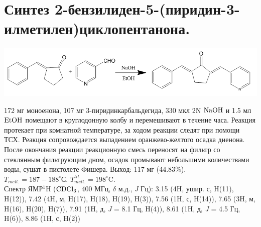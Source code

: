 \documentclass[a4paper]{article}
\begin{document}
\section{Синтез 2-бензилиден-5-(пиридин-3-илметилен)циклопентанона.}
\begin{center}
\includegraphics[scale=0.35]{pictures/3.png}
\end{center}
172 мг моноенона, 107 мг 3-пиридинкарбальдегида, 330 мкл 2N $\ce{NaOH}$ и 1.5 мл $\ce{EtOH}$ помещают в круглодонную колбу и перемешивают в течение часа. Реакция протекает при комнатной температуре, за ходом реакции следят при помощи ТСХ. Реакция сопровождается выпадением оранжево-желтого осадка диенона. После окончания реакции реакционную смесь переносят на фильтр со стеклянным фильтрующим дном, осадок промывают небольшими количествами воды, сушат в пистолете Фишера. Выход: 117 мг (44.83$\%$). \\
$T_{melt.} = 187-188^{\circ}$С. $T_{melt.}^{lit.} = 198^{\circ}$C. \cite{vatsadze2005} \\
Спектр ЯМР$^{1}$H ($\ce{CDCl3}$, 400 МГц, $\delta$ м.д., \textit{J} Гц): 3.15 (4H, ушир. с, H(11), H(12)), 7.42 (4H, м, H(17), H(18), H(19), H(3)), 7.56 (1H, с, H(14)), 7.65 (3H, м, H(16), H(20), H(7)), 7.91 (1H, д, \textit{J} = 8.1 Гц, H(4)), 8.61 (1H, д, \textit{J} = 4.5 Гц, H(6)), 8.86 (1H, с, H(2))
\end{document}
